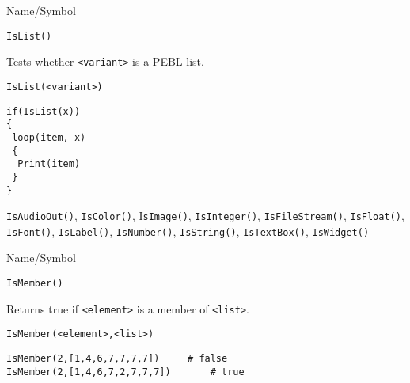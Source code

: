 \begin{desc}{Name/Symbol}
\item[Name/Symbol]	\verb+IsList()+

\item[Description]	Tests whether \verb+<variant>+ is a PEBL list.

\item[Usage]
\begin{verbatim}
IsList(<variant>)
\end{verbatim}

\item[Example]	
\begin{verbatim}
if(IsList(x))
{
 loop(item, x)
 {
  Print(item)
 }
}
\end{verbatim}

\item[See Also] \verb+IsAudioOut()+, \verb+IsColor()+,
  I\verb+sImage()+, \verb+IsInteger()+, \verb+IsFileStream()+,
  \verb+IsFloat()+, \verb+IsFont()+, \verb+IsLabel()+,
  \verb+IsNumber()+, \verb+IsString()+, \verb+IsTextBox()+,
  \verb+IsWidget()+
\end{desc}

\begin{desc}{Name/Symbol}
\item[Name/Symbol]	\verb+IsMember()+

\item[Description]	Returns true if \verb+<element>+ is a member of \verb+<list>+.

\item[Usage]		
\begin{verbatim}
IsMember(<element>,<list>)
\end{verbatim}

\item[Example]	
\begin{verbatim}
IsMember(2,[1,4,6,7,7,7,7])		# false
IsMember(2,[1,4,6,7,2,7,7,7]) 		# true
\end{verbatim}

\item[See Also]	
\end{desc}

